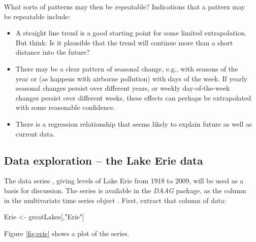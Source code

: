 What sorts of patterns may then be repeatable?  Indications that a
pattern may be repeatable include:
\begin{itemize}
\item A straight line trend is a good starting point for some
  limited extrapolation. But think: Is it plausible that the trend
  will continue more than a short distance into the future?
\item There may be a clear pattern of seasonal change, e.g.,
with seasons of the year or (as happens with airborne pollution)
with days of the week. If yearly seasonal changes persist over
different years, or weekly day-of-the-week changes persist over
different weeks, these effects can perhaps be extrapolated with
some reasonable confidence.
\item There is a regression relationship that seems likely to
explain future as well as current data.
\end{itemize}

\subsection{Data exploration -- the Lake Erie data}

The data series , giving levels of Lake Erie
from 1918 to 2009, will be used as a basis for discussion.
    The series is available in the
    \textit{DAAG} package, as the column  in the
    multivariate time series object .
First, extract that column of data:
\begin{Schunk}
\begin{Sinput}
Erie <- greatLakes[,"Erie"]
\end{Sinput}
\end{Schunk}

Figure \ref{fig:erie} shows a plot of the series.

